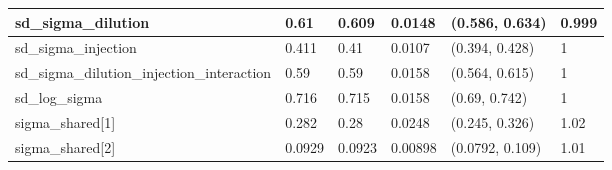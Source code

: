 \begin{tabular}{l|l|l|l|l|l}
\hline
sd\_sigma\_dilution & 0.61 & 0.609 & 0.0148 & (0.586, 0.634) & 0.999\\
\hline
sd\_sigma\_injection & 0.411 & 0.41 & 0.0107 & (0.394, 0.428) & 1\\
\hline
sd\_sigma\_dilution\_injection\_interaction & 0.59 & 0.59 & 0.0158 & (0.564, 0.615) & 1\\
\hline
sd\_log\_sigma & 0.716 & 0.715 & 0.0158 & (0.69, 0.742) & 1\\
\hline
sigma\_shared[1] & 0.282 & 0.28 & 0.0248 & (0.245, 0.326) & 1.02\\
\hline
sigma\_shared[2] & 0.0929 & 0.0923 & 0.00898 & (0.0792, 0.109) & 1.01\\
\hline
\end{tabular}
